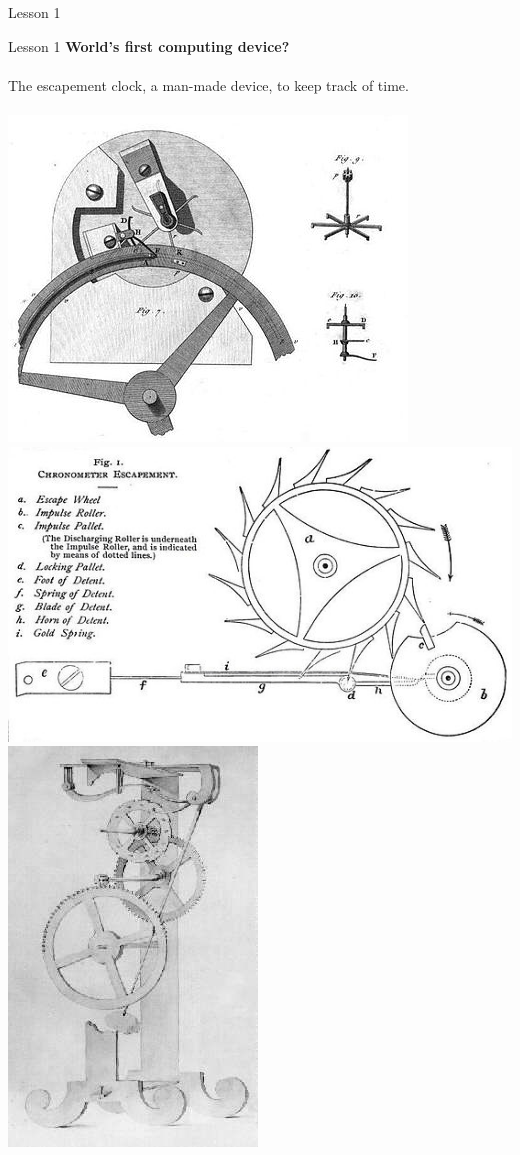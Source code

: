 \documentclass[aspectratio=1610]{beamer}
\begin{document}
\begin{frame}{Lesson 1}{}
\begin{minipage}{.0\textwidth}
\begin{figure}
      \end{figure}
  \end{minipage}  
\end{frame}


\begin{frame}{Lesson 1}{}
\Large
\textbf{World's first computing device?}\\~\\ 
The escapement clock, a man-made device, to keep track of
time.\\~\\ 
\includegraphics[scale=0.35]{Images/Le_Roy_escapement_mechanism}
\includegraphics[scale=0.25]{Images/chronometer_detent_escapement}
\includegraphics[scale=0.35]{Images/Galileo_Pendulum_Clock}

\end{frame}
\end{document}
